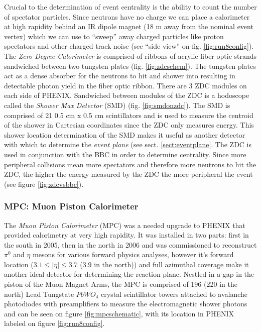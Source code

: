 Crucial to the determination of event centrality is the ability to count the number of spectator particles. Since neutrons have no charge we can place a calorimeter at high rapidity behind an IR dipole magnet (18 m away from the nominal event vertex) which we can use to ``sweep'' away charged particles like proton spectators and other charged track noise (see ``side view'' on fig. \ref{fig:run8config}). The \textit{Zero Degree Calorimeter}\citep{ZDCfocus} is comprised of ribbons of acrylic fiber optic strands sandwiched between two tungsten plates (fig. \ref{fig:zdcschem}). The tungsten plates act as a dense absorber for the neutrons to hit and shower into resulting in detectable photon yield in the fiber optic ribbon. There are 3 ZDC modules on each side of PHENIX. Sandwiched between modules of the ZDC is a hodoscope called the \textit{Shower Max Detector} (SMD) (fig. \ref{fig:smdonzdc}). The SMD is comprised of 21 0.5 cm x 0.5 cm scintillators and is used to measure the centroid of the shower in Cartesian coordinates since the ZDC only measures energy\citep{phenixzdc}. This shower location determination of the SMD makes it useful as another detector with which to determine the \textit{event plane} (see sect. \ref{sect:eventplane}. The ZDC is used in conjunction with the BBC in order to determine centrality. Since more peripheral collisions mean more spectators and therefore more neutrons to hit the ZDC, the higher the energy measured by the ZDC the more peripheral the event (see figure \ref{fig:zdcvsbbc}\citep{Ghosh2001}). 

\subsubsection{MPC: Muon Piston Calorimeter}
The \textit{Muon Piston Calorimeter} (MPC) was a needed upgrade to PHENIX that provided calorimetry at very high rapidity\citep{kleinjanthesis}. It was installed in two parts: first in the south in 2005, then in the north in 2006 and was commissioned to reconstruct $\pi^{0}$ and $\eta$ mesons for various forward physics analyses, however it's forward location ($3.1 \leq  | \eta | \leq 3.7$ ($3.9$ in the north)) and full azimuthal coverage make it another ideal detector for determining the reaction plane. Nestled in a gap in the piston of the Muon Magnet Arms, the MPC is comprised of 196 (220 in the north) Lead Tungstate $PbWO_4$ crystal scintillator towers attached to avalanche photodiodes with preamplifiers to measure the electromagnetic shower photons and can be seen on figure \ref{fig:mpcschematic}, with its location in PHENIX labeled on figure \ref{fig:run8config}.  

